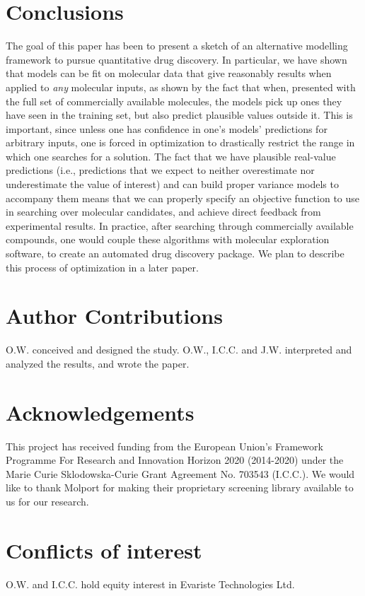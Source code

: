 \documentclass{article}
\begin{document}
\section{Conclusions}
The goal of this paper
has been to present a sketch of an alternative modelling framework to pursue quantitative drug discovery.
In particular, we have shown that models can be fit on molecular data that give reasonably results when applied to \textit{any} molecular inputs, as shown by the fact that when, presented with the full set of commercially available molecules, the models pick up ones they have seen in the training set, but also predict plausible values outside it.  This is important, since unless one has confidence in one's models' predictions for arbitrary inputs, one is forced in optimization to drastically restrict the range in which one searches for a solution.   The fact that we have plausible real-value predictions (i.e., predictions that we expect to neither overestimate nor underestimate the value of interest) and can build proper variance models to accompany them means that we can properly specify an objective function to use in searching over molecular candidates, and achieve direct feedback from experimental results.  In practice, after searching through commercially available compounds, one would couple these algorithms with molecular exploration software\cite{Firth2015,Merk2018}, 
to create an automated drug discovery package.  We plan to describe this process of optimization in a later paper.


\newpage
\section{Author Contributions}
O.W. conceived and designed the study. 
O.W., I.C.C. and J.W. interpreted and analyzed the results, and wrote the paper.

\section{Acknowledgements}
This project has received funding from the European Union’s Framework Programme For Research and Innovation Horizon 2020 (2014-2020) under the Marie Curie Sklodowska-Curie Grant Agreement No. 703543 (I.C.C.).
We would like to thank Molport for making their proprietary screening library available to us for our research.

\section{Conflicts of interest}
O.W. and I.C.C. hold equity interest in Evariste Technologies Ltd.

\newpage



\end{document}
